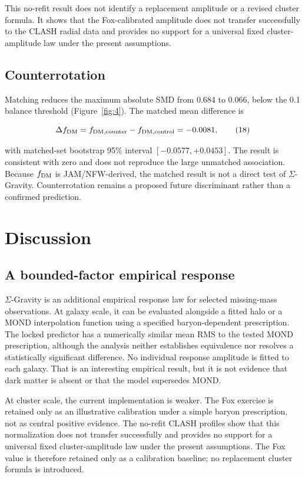 \documentclass[utf8]{FrontiersinHarvard}
\begin{document}
This no-refit result does not identify a replacement amplitude or a revised cluster formula. It shows that the Fox-calibrated amplitude does not transfer successfully to the CLASH radial data and provides no support for a universal fixed cluster-amplitude law under the present assumptions.

\subsection{Counterrotation}\label{counterrotation}

Matching reduces the maximum absolute SMD from 0.684 to 0.066, below the 0.1 balance threshold (Figure~\ref{fig:4}). The matched mean difference is

\[
\Delta f_{\rm DM}
=f_{{\rm DM},{\rm counter}}-f_{{\rm DM},{\rm control}}
=-0.0081 ,
\tag{18}
\]

with matched-set bootstrap 95\% interval \([-0.0577,+0.0453]\). The result is consistent with zero and does not reproduce the large unmatched association. Because \(f_{\rm DM}\) is JAM/NFW-derived, the matched result is not a direct test of \(\Sigma\)-Gravity. Counterrotation remains a proposed future discriminant rather than a confirmed prediction.

\section{Discussion}\label{discussion}

\subsection{A bounded-factor empirical response}\label{a-bounded-factor-empirical-response}

\(\Sigma\)-Gravity is an additional empirical response law for selected missing-mass observations. At galaxy scale, it can be evaluated alongside a fitted halo or a MOND interpolation function using a specified baryon-dependent prescription. The locked predictor has a numerically similar mean RMS to the tested MOND prescription, although the analysis neither establishes equivalence nor resolves a statistically significant difference. No individual response amplitude is fitted to each galaxy. That is an interesting empirical result, but it is not evidence that dark matter is absent or that the model supersedes MOND.

At cluster scale, the current implementation is weaker. The Fox exercise is retained only as an illustrative calibration under a simple baryon prescription, not as central positive evidence. The no-refit CLASH profiles show that this normalization does not transfer successfully and provides no support for a universal fixed cluster-amplitude law under the present assumptions. The Fox value is therefore retained only as a calibration baseline; no replacement cluster formula is introduced.
\end{document}
